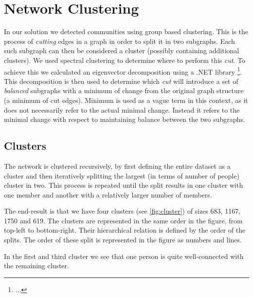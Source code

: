 \chapter{Network Clustering}
In our solution we detected communities using group based clustering.
This is the process of \textit{cutting} edges in a graph in order to split it in two subgraphs.
Each such subgraph can then be considered a cluster (possibly containing additional clusters).
We used spectral clustering to determine where to perform this \textit{cut}.
To achieve this we calculated an eigenvector decomposition using a .NET library \footnote{...}.
This decomposition is then used to determine which \textit{cut} will introduce a set of \textit{balanced} subgraphs with a minimum of change from the original graph structure (a minimum of cut edges).
Minimum is used as a vague term in this context, as it does not necessarily refer to the actual minimal change.
Instead it refers to the minimal change with respect to maintaining balance between the two subgraphs.

\section{Clusters}
The network is clustered recursively, by first defining the entire dataset as a cluster and then iteratively splitting the largest (in terms of number of people) cluster in two.
This process is repeated until the split results in one cluster with one member and another with a relatively larger number of members.

The end-result is that we have four clusters (see \cref{fig:cluster}) of sizes 683, 1167, 1750 and 619.
The clusters are represented in the same order in the figure, from top-left to bottom-right.
Their hierarchical relation is defined by the order of the splits.
The order of these split is represented in the figure as numbers and lines.

In the first and third cluster we see that one person is quite well-connected with the remaining cluster.

